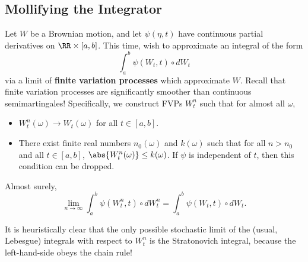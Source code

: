 \documentclass{scrartcl}
\begin{document}
\subsection{Mollifying the Integrator}
Let $W$ be a Brownian motion, and let $\psi(\eta, t)$ have continuous partial derivatives on $\RR\times [a,b]$. This time, wish to approximate an integral of the form
\[
    \int_a^b \psi(W_t, t) \circ dW_t
\]
via a limit of \textbf{finite variation processes} which approximate $W$. Recall that finite variation processes are significantly smoother than continuous semimartingales! Specifically, we construct FVPs $W^n_t$ such that for almost all $\omega$,
\begin{itemize}
    \item $W^n_t(\omega)\to W_t(\omega)$ for all $t\in [a,b]$.
    \item There exist finite real numbers $n_0(\omega)$ and $k(\omega)$ such that for all $n > n_0$ and all $t\in [a,b]$, $\abs{W^n_t(\omega)}\leq k(\omega)$. If $\psi$ is independent of $t$, then this condition can be dropped.
\end{itemize}

\begin{thm}
    Almost surely,
    \[
        \lim_{n\to \infty} \int_a^b \psi(W^n_t, t) \circ dW^n_t = \int_a^b \psi(W_t, t) \circ dW_t.
    \]
\end{thm}

It is heuristically clear that the only possible stochastic limit of the (usual, Lebesgue) integrals with respect to $W^n_t$ is the Stratonovich integral, because the left-hand-side obeys the chain rule!
\end{document}
